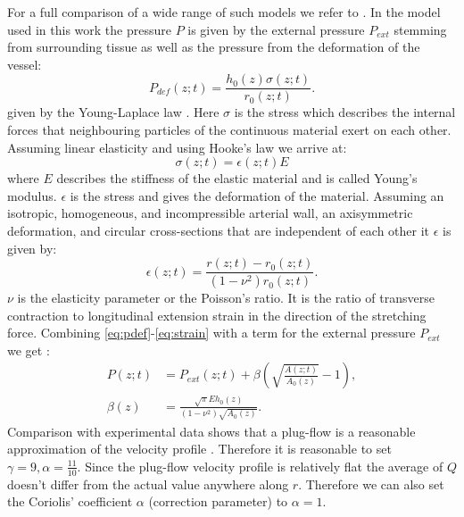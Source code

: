\documentclass[a4paper, oneside]{discothesis}
\begin{document}
For a full comparison of a wide range of such models we refer to \cite{gomez2017analysis}.
In the model used in this work the pressure $P$ is given by the external pressure $P_{ext}$ stemming from surrounding tissue as well as the pressure from the deformation of the vessel:
\begin{equation}
	P_{def}(z;t) = \frac{h_0(z) \sigma(z;t)}{r_0(z;t)}. \label{eq:pdef}
\end{equation}
given by the Young-Laplace law \cite{laplace1805traité} \cite{young1804essay}.
Here $\sigma$ is the stress which describes the internal forces that neighbouring particles of the continuous material exert on each other.
Assuming linear elasticity and using Hooke's law \cite{hooke1678lectures} we arrive at:
\begin{equation}
	\sigma(z;t) = \epsilon(z;t) E \label{eq:stress}
\end{equation}
where $E$ describes the stiffness of the elastic material and is called Young's modulus.
$\epsilon$ is the stress and gives the deformation of the material.
Assuming an isotropic, homogeneous, and incompressible arterial wall, an axisymmetric deformation, and circular cross-sections that are independent of each other it $\epsilon$ is given by:
\begin{equation}
	\epsilon(z;t) = \frac{r(z;t)-r_0(z;t)}{ (1-\nu^2) r_0(z;t)}. \label{eq:strain}
\end{equation}
$\nu$ is the elasticity parameter or the Poisson's ratio.
It is the ratio of transverse contraction to longitudinal extension strain in the direction of the stretching force.
Combining \autoref{eq:pdef}-\autoref{eq:strain} with a term for the external pressure $P_{ext}$ we get \cite{sherwin2003one} \cite{sherwin2003computational}: 
\begin{align}
	P(z;t) &= P_{ext}(z;t) + \beta \left( \sqrt{\frac{A(z;t)}{A_0(z)}}-1 \right),  \label{eq:p_tot}\\
	\beta(z) &=  \frac{\sqrt{\pi} E h_0(z)}{(1-\nu^2) \sqrt{A_0(z)}}.
\end{align}
Comparison with experimental data shows that a plug-flow is a reasonable approximation of the velocity profile \cite{hunter1972numerical} \cite{smith2000generation} \cite{smith2002anatomically}.
Therefore it is reasonable to set $\gamma = 9, \alpha = \frac{11}{10}$.
Since the plug-flow velocity profile is relatively flat the average of $Q$ doesn't differ from the actual value anywhere along $r$.
Therefore we can also set the Coriolis' coefficient $\alpha$ (correction parameter) to $\alpha = 1$. \cite{formaggia2010cardiovascular}
\end{document}

